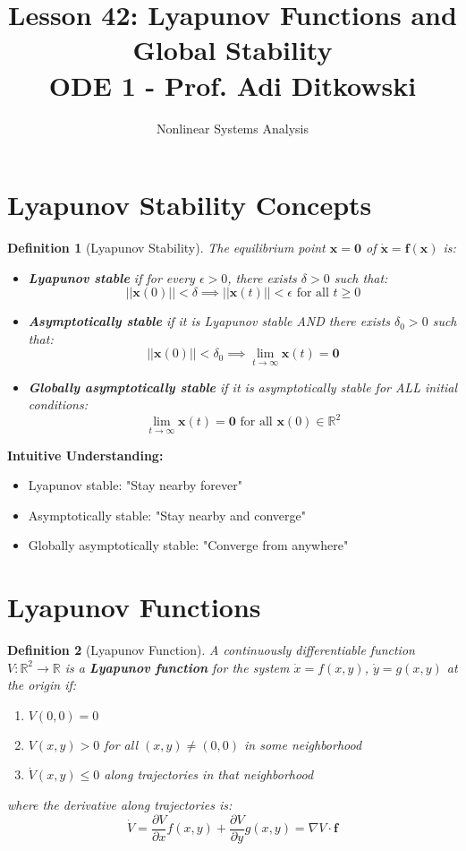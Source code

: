 \documentclass[12pt]{article}
\title{Lesson 42: Lyapunov Functions and Global Stability\\
\large ODE 1 - Prof. Adi Ditkowski}
\author{Nonlinear Systems Analysis}
\date{}
\newtheorem{definition}{Definition}
\begin{document}
\maketitle

\section{Lyapunov Stability Concepts}

\begin{definition}[Lyapunov Stability]
The equilibrium point $\mathbf{x} = \mathbf{0}$ of $\dot{\mathbf{x}} = \mathbf{f}(\mathbf{x})$ is:
\begin{itemize}
    \item \textbf{Lyapunov stable} if for every $\epsilon > 0$, there exists $\delta > 0$ such that:
    $$||\mathbf{x}(0)|| < \delta \implies ||\mathbf{x}(t)|| < \epsilon \text{ for all } t \geq 0$$

    \item \textbf{Asymptotically stable} if it is Lyapunov stable AND there exists $\delta_0 > 0$ such that:
    $$||\mathbf{x}(0)|| < \delta_0 \implies \lim_{t \to \infty} \mathbf{x}(t) = \mathbf{0}$$

    \item \textbf{Globally asymptotically stable} if it is asymptotically stable for ALL initial conditions:
    $$\lim_{t \to \infty} \mathbf{x}(t) = \mathbf{0} \text{ for all } \mathbf{x}(0) \in \mathbb{R}^2$$
\end{itemize}
\end{definition}

\begin{keypoint}
\textbf{Intuitive Understanding:}
\begin{itemize}
    \item Lyapunov stable: "Stay nearby forever"
    \item Asymptotically stable: "Stay nearby and converge"
    \item Globally asymptotically stable: "Converge from anywhere"
\end{itemize}
\end{keypoint}

\section{Lyapunov Functions}

\begin{definition}[Lyapunov Function]
A continuously differentiable function $V: \mathbb{R}^2 \to \mathbb{R}$ is a \textbf{Lyapunov function} for the system $\dot{x} = f(x,y)$, $\dot{y} = g(x,y)$ at the origin if:
\begin{enumerate}
    \item $V(0,0) = 0$
    \item $V(x,y) > 0$ for all $(x,y) \neq (0,0)$ in some neighborhood
    \item $\dot{V}(x,y) \leq 0$ along trajectories in that neighborhood
\end{enumerate}
where the derivative along trajectories is:
$$\dot{V} = \frac{\partial V}{\partial x}f(x,y) + \frac{\partial V}{\partial y}g(x,y) = \nabla V \cdot \mathbf{f}$$
\end{definition}
\end{document}
